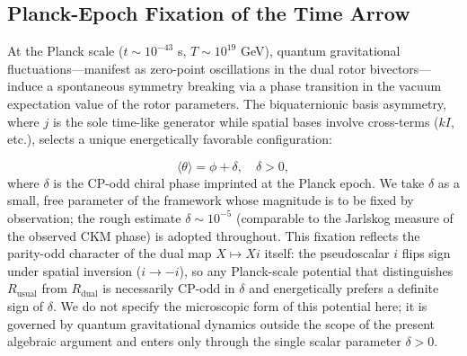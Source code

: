 \documentclass[dvipdfmx,a4paper]{article}
\begin{document}
\subsection{Planck-Epoch Fixation of the Time Arrow}

At the Planck scale ($t \sim 10^{-43}$ s, $T \sim 10^{19}$ GeV), quantum gravitational fluctuations---manifest as zero-point oscillations in the dual rotor bivectors---induce a spontaneous symmetry breaking via a phase transition in the vacuum expectation value of the rotor parameters. The biquaternionic basis asymmetry, where $j$ is the sole time-like generator while spatial bases involve cross-terms ($kI$, etc.), selects a unique energetically favorable configuration:

\[
\langle \theta \rangle = \phi + \delta, \quad \delta > 0,
\]
where $\delta$ is the CP-odd chiral phase imprinted at the Planck epoch. We take $\delta$ as a small, free parameter of the framework whose magnitude is to be fixed by observation; the rough estimate $\delta \sim 10^{-5}$ (comparable to the Jarlskog measure of the observed CKM phase) is adopted throughout. This fixation reflects the parity-odd character of the dual map $X \mapsto X i$ itself: the pseudoscalar $i$ flips sign under spatial inversion ($i \to -i$), so any Planck-scale potential that distinguishes $R_\text{usual}$ from $R_\text{dual}$ is necessarily CP-odd in $\delta$ and energetically prefers a definite sign of $\delta$. We do not specify the microscopic form of this potential here; it is governed by quantum gravitational dynamics outside the scope of the present algebraic argument and enters only through the single scalar parameter $\delta > 0$.
\end{document}
